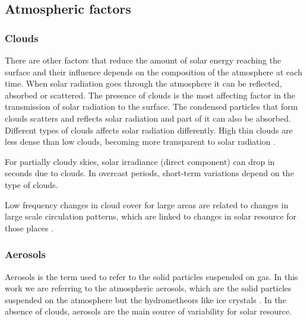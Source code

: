 \subsection{Atmospheric factors}

\subsubsection{Clouds}

There are other factors that reduce the amount of solar energy reaching the surface and their influence depends on the composition of the atmosphere at each time. When solar radiation goes through the atmosphere it can be reflected, absorbed or scattered. The presence of clouds is the most affecting factor in the transmission of solar radiation to the surface. The condensed particles that form clouds scatters and reflects solar radiation and part of it can also be absorbed. Different types of clouds affects solar radiation differently\cite*{Page2012}. High thin clouds are less dense than low clouds, becoming more transparent to solar radiation \cite*{Kasten1980}. %

For partially cloudy skies, solar irradiance (direct component) can drop in seconds \cite*{Page2012} due to clouds. In overcast periods, short-term variations depend on the type of clouds.

Low frequency changes in cloud cover for large areas are related to changes in large scale circulation patterns, which are linked to changes in solar resource for those places \cite*{Chiacchio2010, Sanchez-Lorenzo2009}.

\subsubsection{Aerosols}

Aerosols is the term used to refer to the solid particles suspended on gas. In this work we are referring to the atmospheric aerosols, which are the solid particles suspended on the atmosphere but the hydrometheors like ice crystals \cite*{boucher2015}. In the absence of clouds, aerosols are the main source of variability for solar resource. 

